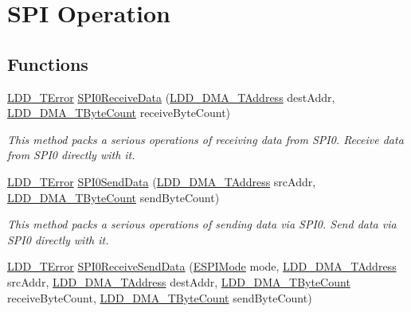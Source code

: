 \hypertarget{group___s_p_i___operation}{\section{S\-P\-I Operation}
\label{group___s_p_i___operation}
}
\subsection*{Functions}
\begin{DoxyCompactItemize}
\item 
\hyperlink{group___p_e___types__module_ga24c2b045fd04e79e85f261ce4df35588}{L\-D\-D\-\_\-\-T\-Error} \hyperlink{group___s_p_i___operation_ga3447139ae81a832e0ca995c54c919479}{S\-P\-I0\-Receive\-Data} (\hyperlink{group___p_e___types__module_gab8287f62db7ff96992355760b652cd07}{L\-D\-D\-\_\-\-D\-M\-A\-\_\-\-T\-Address} dest\-Addr, \hyperlink{group___p_e___types__module_gac001a681eb67942fa78ac9b62ba3b0d6}{L\-D\-D\-\_\-\-D\-M\-A\-\_\-\-T\-Byte\-Count} receive\-Byte\-Count)
\begin{DoxyCompactList}\small\item\em This method packs a serious operations of receiving data from S\-P\-I0. Receive data from S\-P\-I0 directly with it. \end{DoxyCompactList}\item 
\hyperlink{group___p_e___types__module_ga24c2b045fd04e79e85f261ce4df35588}{L\-D\-D\-\_\-\-T\-Error} \hyperlink{group___s_p_i___operation_gabe592767cc86810541fab7fa2abe8323}{S\-P\-I0\-Send\-Data} (\hyperlink{group___p_e___types__module_gab8287f62db7ff96992355760b652cd07}{L\-D\-D\-\_\-\-D\-M\-A\-\_\-\-T\-Address} src\-Addr, \hyperlink{group___p_e___types__module_gac001a681eb67942fa78ac9b62ba3b0d6}{L\-D\-D\-\_\-\-D\-M\-A\-\_\-\-T\-Byte\-Count} send\-Byte\-Count)
\begin{DoxyCompactList}\small\item\em This method packs a serious operations of sending data via S\-P\-I0. Send data via S\-P\-I0 directly with it. \end{DoxyCompactList}\item 
\hyperlink{group___p_e___types__module_ga24c2b045fd04e79e85f261ce4df35588}{L\-D\-D\-\_\-\-T\-Error} \hyperlink{group___s_p_i___operation_ga4c6ad3eda775bfe22756297961355f8c}{S\-P\-I0\-Receive\-Send\-Data} (\hyperlink{group___enum_grp_ga34cca0902b647bf356893ca1ee8d202b}{E\-S\-P\-I\-Mode} mode, \hyperlink{group___p_e___types__module_gab8287f62db7ff96992355760b652cd07}{L\-D\-D\-\_\-\-D\-M\-A\-\_\-\-T\-Address} src\-Addr, \hyperlink{group___p_e___types__module_gab8287f62db7ff96992355760b652cd07}{L\-D\-D\-\_\-\-D\-M\-A\-\_\-\-T\-Address} dest\-Addr, \hyperlink{group___p_e___types__module_gac001a681eb67942fa78ac9b62ba3b0d6}{L\-D\-D\-\_\-\-D\-M\-A\-\_\-\-T\-Byte\-Count} receive\-Byte\-Count, \hyperlink{group___p_e___types__module_gac001a681eb67942fa78ac9b62ba3b0d6}{L\-D\-D\-\_\-\-D\-M\-A\-\_\-\-T\-Byte\-Count} send\-Byte\-Count)

\end{DoxyCompactItemize}
